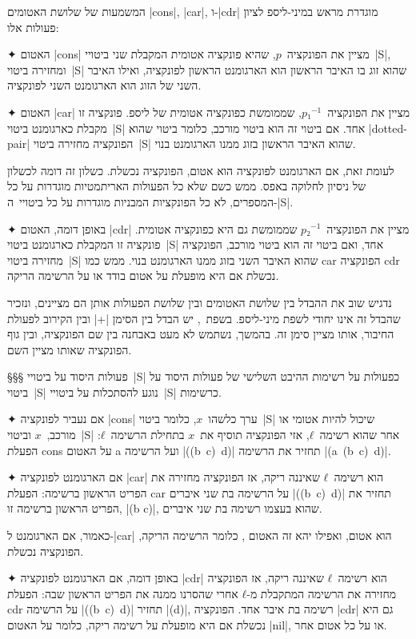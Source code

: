 המשמעות של שלושת האטומים \T|cons|, \T|car|, ו-\T|cdr| מוגדרת מראש במיני-ליספ
לציון פעולות אלו:

\begin{enumerate}
  ✦ האטום \T|cons| מציין את הפונקציה~$p$, שהיא פונקציה אטומית המקבלת שני
  ביטויי~\E|S|, ומחזירה ביטוי~\E|S| שהוא זוג בו האיבר הראשון הוא הארגומנט
  הראשון לפונקציה, ואילו האיבר השני של הזוג הוא הארגומנט השני לפונקציה.

  ✦ האטום \T|car| מציין את הפונקציה~$p₁^{-1}$, שממומשת כפונקציה אטומית של
  ליספ. פונקציה זו מקבלת כארגומנט ביטוי~\E|S| אחד. אם ביטוי זה הוא ביטוי מורכב,
  כלומר ביטוי שהוא \E|dotted-pair| הפונקציה מחזירה ביטוי~\E|S| שהוא האיבר
  הראשון בזוג ממנו הארגומנט בנוי.

  לעומת זאת, אם הארגומנט לפונקציה הוא אטום, הפונקציה נכשלת. כשלון זה דומה
  לכשלון של ניסיון לחלוקה באפס. ממש כשם שלא כל הפעולות האריתמטיות מוגדרות על כל
  המספרים, לא כל הפונקציות המבניות מוגדרות על כל ביטויי~ה-\E|S|.

  ✦ באופן דומה, האטום \T|cdr| מציין את הפונקציה~$p₂^{-1}$ שממומשת גם היא
  כפונקציה אטומית. פונקציה זו המקבלת כארגומנט ביטוי~\E|S| אחד, ואם ביטוי זה
  הוא ביטוי מורכב, הפונקציה מחזירה ביטוי~\E|S| שהוא האיבר השני בזוג ממנו
  הארגומנט בנוי. ממש כמו car הפונקציה cdr נכשלת אם היא מופעלת על אטום בודד
  או על הרשימה הריקה.
\end{enumerate}

נדגיש שוב את ההבדל בין שלושת האטומים ובין שלושת הפעולות אותן הם מציינים, ונזכיר
שהבדל זה אינו יחודי לשפת מיני-ליספ. בשפת~\CPL, יש הבדל בין הסימן \T|+| ובין
הקירוב לפעולת החיבור, אותו מציין סימן זה. בהמשך, נשתמש לא מעט באבחנה בין שם
הפונקציה, ובין גוף הפונקציה שאותו מציין השם.

§§§ פעולות היסוד על ביטויי~\E|S| כפעולות על רשימות
ההיבט השלישי של פעולות היסוד על ביטוי~\E|S| נוגע להסתכלות על ביטויי~\E|S|
כרשימות.

\begin{enumerate}
  ✦ אם נעביר לפונקציה \T|cons| ערך כלשהו~$x$, כלומר ביטוי~\E|S| שיכול להיות
  אטומי או מורכב,~$x$ וביטוי~\E|S| אחר שהוא רשימה~$ℓ$, אזי הפונקציה תוסיף את~$x$
  בתחילת הרשימה~$ℓ$: הפעלת cons על האטום a ועל הרשימה \E|((b~c)~d)| תחזיר את
  הרשימה \E|(a~(b~c)~d)|.

  ✦ אם הארגומנט לפונקציה \T|car| הוא רשימה~$ℓ$ שאיננה ריקה, אז הפונקציה מחזירה
  את הפריט הראשון ברשימה: הפעלת car על הרשימה בת שני איברים \E|((b~c)~d)| תחזיר
  את הפריט הראשון ברשימה זו, \E|(b c)|, שהוא בעצמו רשימה בת שני איברים.

  כאמור, אם הארגומנט ל-\E|car| הוא אטום, ואפילו יהא זה האטום ,
  כלומר הרשימה הריקה, הפונקציה נכשלת.

  ✦ באופן דומה, אם הארגומנט לפונקציה \T|cdr| הוא רשימה~$ℓ$ שאיננה ריקה, אז
  הפונקציה מחזירה את הרשימה המתקבלת מ-$ℓ$ אחרי שהסרנו ממנה את הפריט הראשון שבה:
  הפעלת cdr על הרשימה \E|((b~c)~d)| תחזיר \E|(d)|, רשימה בת איבר אחד. הפונקציה
  \E|cdr| גם היא נכשלת אם היא מופעלת על רשימה ריקה, כלומר על האטום \E|nil|, או על
  כל אטום אחר.
\end{enumerate}

